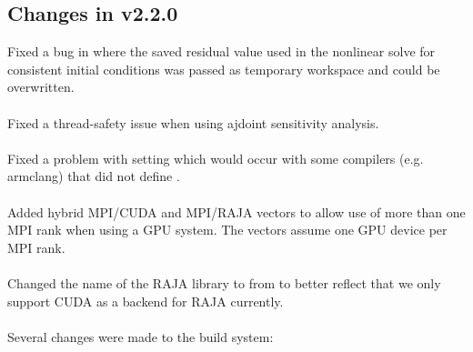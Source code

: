 \subsection*{Changes in v2.2.0}

Fixed a bug in {\idas} where the saved residual value used in the nonlinear
solve for consistent initial conditions was passed as temporary workspace and
could be overwritten.
\\
\\
\noindent Fixed a thread-safety issue when using ajdoint sensitivity analysis.
\\
\\
\noindent Fixed a problem with setting  which would occur
with some compilers (e.g. armclang) that did not define .
\\
\\
\noindent Added hybrid MPI/CUDA and MPI/RAJA vectors to allow use of more 
than one MPI rank when using a GPU system.  The vectors assume one GPU 
device per MPI rank.
\\
\\
\noindent Changed the name of the RAJA {\nvector} library to
 from \newline
{} to better reflect that we only support CUDA
as a backend for RAJA currently.
\\
\\
\noindent Several changes were made to the build system:
